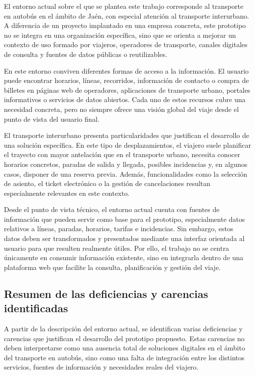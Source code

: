 El entorno actual sobre el que se plantea este trabajo corresponde al transporte en autobús en el ámbito de Jaén, con especial atención al transporte interurbano. A diferencia de un proyecto implantado en una empresa concreta, este prototipo no se integra en una organización específica, sino que se orienta a mejorar un contexto de uso formado por viajeros, operadores de transporte, canales digitales de consulta y fuentes de datos públicas o reutilizables.

En este entorno conviven diferentes formas de acceso a la información. El usuario puede encontrar horarios, líneas, recorridos, información de contacto o compra de billetes en páginas web de operadores, aplicaciones de transporte urbano, portales informativos o servicios de datos abiertos. Cada uno de estos recursos cubre una necesidad concreta, pero no siempre ofrece una visión global del viaje desde el punto de vista del usuario final.

El transporte interurbano presenta particularidades que justifican el desarrollo de una solución específica. En este tipo de desplazamientos, el viajero suele planificar el trayecto con mayor antelación que en el transporte urbano, necesita conocer horarios concretos, paradas de salida y llegada, posibles incidencias y, en algunos casos, disponer de una reserva previa. Además, funcionalidades como la selección de asiento, el ticket electrónico o la gestión de cancelaciones resultan especialmente relevantes en este contexto.

Desde el punto de vista técnico, el entorno actual cuenta con fuentes de información que pueden servir como base para el prototipo, especialmente datos relativos a líneas, paradas, horarios, tarifas e incidencias. Sin embargo, estos datos deben ser transformados y presentados mediante una interfaz orientada al usuario para que resulten realmente útiles. Por ello, el trabajo no se centra únicamente en consumir información existente, sino en integrarla dentro de una plataforma web que facilite la consulta, planificación y gestión del viaje.

\subsection{Resumen de las deficiencias y carencias identificadas}

A partir de la descripción del entorno actual, se identifican varias deficiencias y carencias que justifican el desarrollo del prototipo propuesto. Estas carencias no deben interpretarse como una ausencia total de soluciones digitales en el ámbito del transporte en autobús, sino como una falta de integración entre los distintos servicios, fuentes de información y necesidades reales del viajero.

